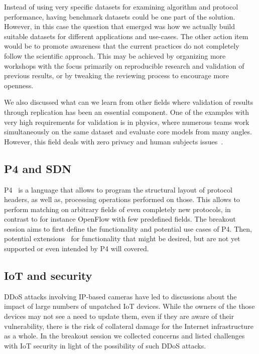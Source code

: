 Instead of using very specific datasets for examining algorithm and protocol
performance, having benchmark datasets could be one part of the solution.
However, in this case the question that emerged was how we actually build
suitable datasets for different applications and use-cases.  The other action
item would be to promote awareness that the current practices do not
completely follow the scientific approach. This may be achieved by organizing
more workshops with the focus primarily on reproducible research and
validation of previous results, or by tweaking the reviewing process to
encourage more openness.

We also discussed what can we learn from other fields where validation of
results through replication has been an essential component. One of the
examples with very high requirements for validation is in physics, where
numerous teams work simultaneously on the same dataset and evaluate core
models from many angles. However, this field deals with zero privacy and human
subjects issues~\cite{fbai:infocom:2003}.

\subsection{P4 and SDN}

P4~\cite{pbosshart:ccr:2014} is a language that allows to program the
structural layout of protocol headers, as well as, processing operations
performed on those.  This allows to perform matching on arbitrary fields of
even completely new protocols, in contrast to for instance OpenFlow with few
predefined fields.  The breakout session aims to first define the
functionality and potential use cases of P4.  Then, potential
extensions~\cite{abhashkumar:sosr:2017} for functionality that might be
desired, but are not yet supported or even intended by P4 will covered.

\subsection{IoT and security}

\ac{DDoS} attacks involving IP-based cameras have led to discussions about the
impact of large numbers of unpatched \ac{IoT} devices. While the owners of the
those devices may not see a need to update them, even if they are aware of
their vulnerability, there is the risk of collateral damage for the Internet
infrastructure as a whole. In the breakout session we collected concerns and
listed challenges with IoT security in light of the possibility of such
\ac{DDoS} attacks.

